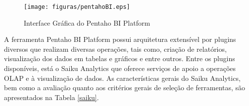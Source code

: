 \begin{figure}[ht!]
\begin{center}
\texttt{[image: figuras/pentahoBI.eps]}
\caption{Interface Gráfica do Pentaho BI Platform}
\label{BIplatform}
\end{center}
\end{figure}
\FloatBarrier
 

A ferramenta Pentaho BI Platform possui arquitetura extensível por plugins diversos que realizam diversas operações, tais como, criação de relatórios, visualização dos dados em tabelas e gráficos e entre outros. Entre os plugins disponíveis, está o Saiku Analytics que oferece serviços de apoio a operações OLAP e à visualização de dados. As características gerais do Saiku Analytics, bem como a avaliação quanto aos critérios gerais de seleção de ferramentas, são apresentados na Tabela \ref{saiku}. 

